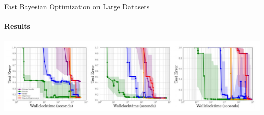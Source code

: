 \begin{frame}[c]{Fast Bayesian Optimization on Large Datasets}
\framesubtitle{Results}

\centering
\includegraphics[width=1.\textwidth]{w07_hpo_grey_box/images/fabolas/fabolas_results.jpg}

\end{frame}
